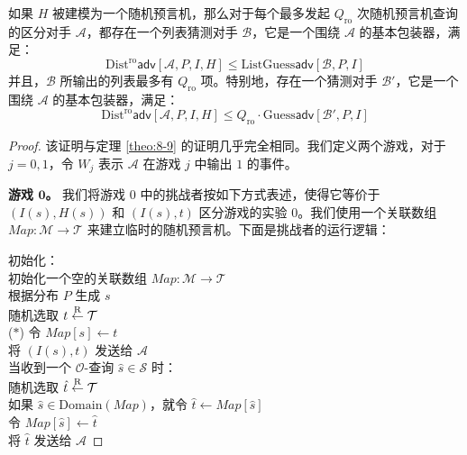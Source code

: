 \begin{theorem}\label{theo:8-10}
如果 $H$ 被建模为一个随机预言机，那么对于每个最多发起 $Q_\mathrm{ro}$ 次随机预言机查询的区分对手 $\mathcal{A}$，都存在一个列表猜测对手 $\mathcal{B}$，它是一个围绕 $\mathcal{A}$ 的基本包装器，满足：
\[
\mathrm{Dist}^\mathrm{ro}\mathsf{adv}[\mathcal{A},P,I,H]
\leq
\mathrm{ListGuess}\mathsf{adv}[\mathcal{B},P,I]
\]
并且，$\mathcal{B}$ 所输出的列表最多有 $Q_\mathrm{ro}$ 项。特别地，存在一个猜测对手 $\mathcal{B}'$，它是一个围绕 $\mathcal{A}$ 的基本包装器，满足：
\[
\mathrm{Dist}^\mathrm{ro}\mathsf{adv}[\mathcal{A},P,I,H]
\leq
Q_\mathrm{ro}\cdot\mathrm{Guess}\mathsf{adv}[\mathcal{B}',P,I]
\]
\end{theorem}

\begin{proof}
该证明与定理 \ref{theo:8-9} 的证明几乎完全相同。我们定义两个游戏，对于 $j=0,1$，令 $W_j$ 表示 $\mathcal{A}$ 在游戏 $j$ 中输出 $1$ 的事件。

\vspace{5pt}

\noindent\textbf{游戏 $\mathbf{0}$。}
我们将游戏 $0$ 中的挑战者按如下方式表述，使得它等价于 $(I(s),H(s))$ 和 $(I(s),t)$ 区分游戏的实验 $0$。我们使用一个关联数组 $Map:\mathcal{M}\to\mathcal{T}$ 来建立临时的随机预言机。下面是挑战者的运行逻辑：

\vspace{5pt}

\hspace*{5pt} 初始化：\\
\hspace*{50pt} 初始化一个空的关联数组 $Map:\mathcal{M}\to\mathcal{T}$\\
\hspace*{50pt} 根据分布 $P$ 生成 $s$\\
\hspace*{50pt} 随机选取 $t\overset{\rm R}\leftarrow\mathcal{T}$\\
\hspace*{5pt} ($*$)
\hspace*{24.5pt} 令 $Map[s]\leftarrow t$\\
\hspace*{50pt} 将 $(I(s),t)$ 发送给 $\mathcal{A}$\\
\hspace*{26pt} 当收到一个 $\mathcal{O}$-查询 $\hat{s}\in\mathcal{S}$ 时：\\
\hspace*{50pt} 随机选取 $\hat{t}\overset{\rm R}\leftarrow\mathcal{T}$\\
\hspace*{50pt} 如果 $\hat{s}\in\mathrm{Domain}(Map)$，就令 $\hat{t}\leftarrow Map[\hat{s}]$\\
\hspace*{50pt} 令 $Map[\hat{s}]\leftarrow\hat{t}$\\
\hspace*{50pt} 将 $\hat{t}$ 发送给 $\mathcal{A}$


\end{proof}
